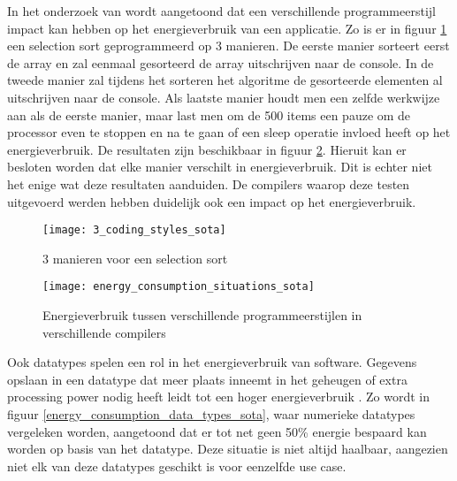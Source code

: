 In het onderzoek van \textcite{Hassan2017} wordt aangetoond dat een verschillende programmeerstijl impact kan hebben op het energieverbruik van een applicatie. Zo is er in figuur \ref{3_coding_styles_sota} een selection sort geprogrammeerd op 3 manieren. De eerste manier sorteert eerst de array en zal eenmaal gesorteerd de array uitschrijven naar de console. In de tweede manier zal tijdens het sorteren het algoritme de gesorteerde elementen al uitschrijven naar de console. Als laatste manier houdt men een zelfde werkwijze aan als de eerste manier, maar last men om de 500 items een pauze om de processor even te stoppen en na te gaan of een sleep operatie invloed heeft op het energieverbruik. De resultaten zijn beschikbaar in figuur \ref{energy_consumption_situations_sota}. Hieruit kan er besloten worden dat elke manier verschilt in energieverbruik. Dit is echter niet het enige wat deze resultaten aanduiden. De compilers waarop deze testen uitgevoerd werden hebben duidelijk ook een impact op het energieverbruik.\\

\bigskip

\begin{figure}[H]
    \texttt{[image: 3\_coding\_styles\_sota]}
    \centering
    \caption{3 manieren voor een selection sort \autocite{Hassan2017}}
    \label{3_coding_styles_sota}
\end{figure}

\begin{figure}[H]
    \texttt{[image: energy\_consumption\_situations\_sota]}
    \centering
    \caption[Energieverbruik tussen programmeerstijlen]{Energieverbruik tussen verschillende programmeerstijlen in verschillende compilers \autocite{Hassan2017}}
    \label{energy_consumption_situations_sota}
\end{figure}



Ook datatypes spelen een rol in het energieverbruik van software. Gegevens opslaan in een datatype dat meer plaats inneemt in het geheugen of extra processing power nodig heeft leidt tot een hoger energieverbruik \autocite{Dutta2023}. Zo wordt in figuur \ref{energy_consumption_data_types_sota}, waar numerieke datatypes vergeleken worden, aangetoond dat er tot net geen 50\% energie bespaard kan worden op basis van het datatype. Deze situatie is niet altijd haalbaar, aangezien niet elk van deze datatypes geschikt is voor eenzelfde use case. 

\bigskip


